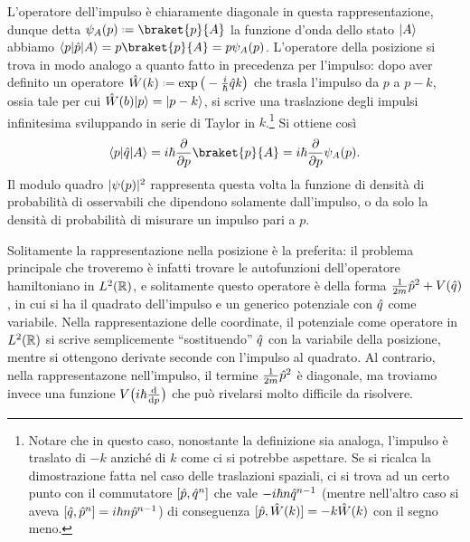 L'operatore dell'impulso è chiaramente diagonale in questa rappresentazione, dunque detta $\psi_A(p)\defeq\braket{p}{A}$ la funzione d'onda dello stato $\ket{A}$ abbiamo $\bra{p}\op p\ket{A}=p\braket{p}{A}=p\psi_A(p)$.
L'operatore della posizione si trova in modo analogo a quanto fatto in precedenza per l'impulso: dopo aver definito un operatore $\op W(k)\defeq\exp\big(-\frac{i}{\hbar}\op qk\big)$ che trasla l'impulso da $p$ a $p-k$, ossia tale per cui $\op W(b)\ket{p}=\ket{p-k}$, si scrive una traslazione degli impulsi infinitesima sviluppando in serie di Taylor in $k$.\footnote{Notare che in questo caso, nonostante la definizione sia analoga, l'impulso è traslato di $-k$ anzich\'e di $k$ come ci si potrebbe aspettare. Se si ricalca la dimostrazione fatta nel caso delle traslazioni spaziali, ci si trova ad un certo punto con il commutatore $[\op p,\op q^n]$ che vale $-i\hbar n\op q^{n-1}$ (mentre nell'altro caso si aveva $[\op q,\op p^n]=i\hbar n\op p^{n-1}$) di conseguenza $[\op p,\op W(k)]=-k\op W(k)$ con il segno meno.}
Si ottiene cos\`i
\begin{equation}
	\bra{p}\op q\ket{A}=i\hbar\drp{}{p}\braket{p}{A}=i\hbar\drp{}{p}\psi_A(p).
	\label{eq:rappresentazione-posizione-base-impulso}
\end{equation}
Il modulo quadro $\abs{\psi(p)}^2$ rappresenta questa volta la funzione di densità di probabilità di osservabili che dipendono solamente dall'impulso, o da solo la densità di probabilità di misurare un impulso pari a $p$.

Solitamente la rappresentazione nella posizione è la preferita: il problema principale che troveremo è infatti trovare le autofunzioni dell'operatore hamiltoniano in $\leb[2]{\R}$, e solitamente questo operatore è della forma $\frac1{2m}\op p^2+V(\op q)$, in cui si ha il quadrato dell'impulso e un generico potenziale con $\op q$ come variabile.
Nella rappresentazione delle coordinate, il potenziale come operatore in $\leb[2]{\R}$ si scrive semplicemente ``sostituendo'' $\op q$ con la variabile della posizione, mentre si ottengono derivate seconde con l'impulso al quadrato.
Al contrario, nella rappresentazone nell'impulso, il termine $\frac1{2m}\op p^2$ è diagonale, ma troviamo invece una funzione $V\big(i\hbar\drv{}{p}\big)$ che può rivelarsi molto difficile da risolvere.

